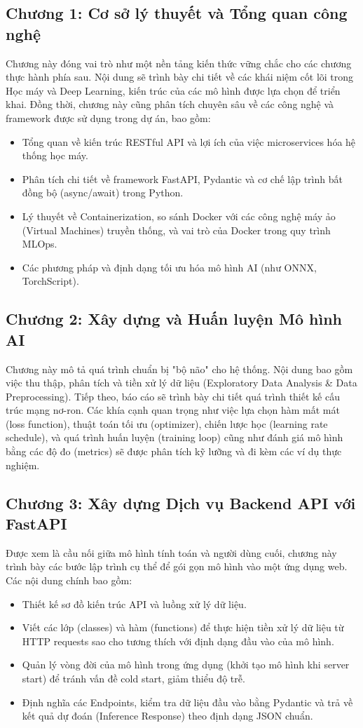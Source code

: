 \subsection*{Chương 1: Cơ sở lý thuyết và Tổng quan công nghệ}
Chương này đóng vai trò như một nền tảng kiến thức vững chắc cho các chương thực hành phía sau. Nội dung sẽ trình bày chi tiết về các khái niệm cốt lõi trong Học máy và Deep Learning, kiến trúc của các mô hình được lựa chọn để triển khai. Đồng thời, chương này cũng phân tích chuyên sâu về các công nghệ và framework được sử dụng trong dự án, bao gồm:
\begin{itemize}
    \item Tổng quan về kiến trúc RESTful API và lợi ích của việc microservices hóa hệ thống học máy.
    \item Phân tích chi tiết về framework FastAPI, Pydantic và cơ chế lập trình bất đồng bộ (async/await) trong Python.
    \item Lý thuyết về Containerization, so sánh Docker với các công nghệ máy ảo (Virtual Machines) truyền thống, và vai trò của Docker trong quy trình MLOps.
    \item Các phương pháp và định dạng tối ưu hóa mô hình AI (như ONNX, TorchScript).
\end{itemize}

\subsection*{Chương 2: Xây dựng và Huấn luyện Mô hình AI}
Chương này mô tả quá trình chuẩn bị "bộ não" cho hệ thống. Nội dung bao gồm việc thu thập, phân tích và tiền xử lý dữ liệu (Exploratory Data Analysis \& Data Preprocessing). Tiếp theo, báo cáo sẽ trình bày chi tiết quá trình thiết kế cấu trúc mạng nơ-ron. Các khía cạnh quan trọng như việc lựa chọn hàm mất mát (loss function), thuật toán tối ưu (optimizer), chiến lược học (learning rate schedule), và quá trình huấn luyện (training loop) cũng như đánh giá mô hình bằng các độ đo (metrics) sẽ được phân tích kỹ lưỡng và đi kèm các ví dụ thực nghiệm.

\subsection*{Chương 3: Xây dựng Dịch vụ Backend API với FastAPI}
Được xem là cầu nối giữa mô hình tính toán và người dùng cuối, chương này trình bày các bước lập trình cụ thể để gói gọn mô hình vào một ứng dụng web. Các nội dung chính bao gồm:
\begin{itemize}
    \item Thiết kế sơ đồ kiến trúc API và luồng xử lý dữ liệu.
    \item Viết các lớp (classes) và hàm (functions) để thực hiện tiền xử lý dữ liệu từ HTTP requests sao cho tương thích với định dạng đầu vào của mô hình.
    \item Quản lý vòng đời của mô hình trong ứng dụng (khởi tạo mô hình khi server start) để tránh vấn đề cold start, giảm thiểu độ trễ.
    \item Định nghĩa các Endpoints, kiểm tra dữ liệu đầu vào bằng Pydantic và trả về kết quả dự đoán (Inference Response) theo định dạng JSON chuẩn.
\end{itemize}

